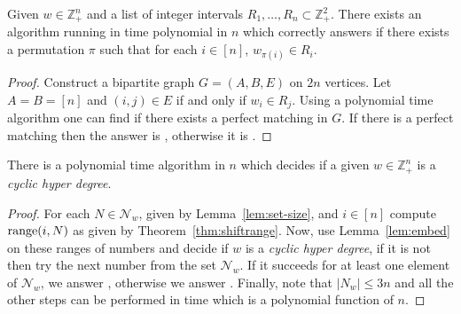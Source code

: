 \begin{lemma}
\label{lem:embed}
 Given $w\in\mathbb{Z}_+^n$ and a list of integer intervals $R_1,\dots,R_n \subset \mathbb{Z}_+^2$. There exists an algorithm running in time polynomial in $n$ which correctly answers if there exists a permutation $\pi$ such that  for each $i\in [n]$, $w_{\pi(i)}\in R_i$. 
\end{lemma}
\begin{proof}
 Construct a bipartite graph $G=(A,B,E)$ on $2n$ vertices. Let $A=B=[n]$ and $(i,j)\in E$ if and only if $w_i \in R_j$. Using a polynomial time algorithm one can find if there exists a perfect matching in $G$. If there is a perfect matching then the answer is \YES, otherwise it is \NO.
\end{proof}

\begin{theorem}
 \label{thm:chd-poly}
 There is a polynomial time algorithm in $n$ which decides if a given $w\in\mathbb{Z}_+^n$ is a {\em cyclic hyper degree}.
\end{theorem}

\begin{proof}
 For each $N\in\mathcal{N}_w$, given by Lemma~\ref{lem:set-size}, and $i\in[n]$ compute ${\rm range}(i,N)$ as given by Theorem~\ref{thm:shiftrange}. Now, use Lemma~\ref{lem:embed} on these ranges of numbers and decide if $w$ is a {\em cyclic hyper degree}, if it is not then try the next number from the set $\mathcal{N}_w$. If it succeeds for at least one element of $\mathcal{N}_w$, we answer \YES, otherwise we answer \NO. Finally, note that $\vert N_w \vert\leq 3n$ and all the other steps can be performed in time which is a polynomial function of $n$. 
\end{proof}